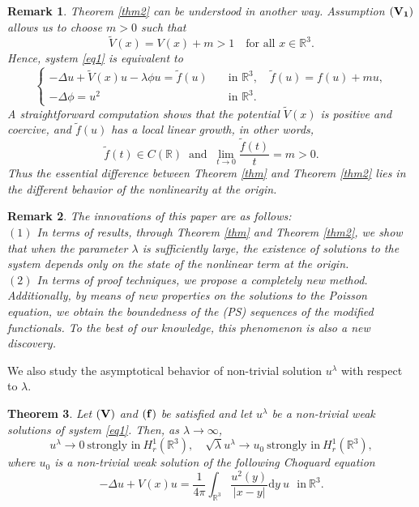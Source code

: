 \documentclass[12pt]{amsart}
\numberwithin{equation}{section}
\newtheorem{theorem}{Theorem}[section]
\newtheorem{remark}[theorem]{Remark}
\theoremstyle{definition}
\begin{document}
\begin{remark}{\rm
Theorem \ref{thm2} can be understood in another way.
Assumption ${\bf (V_1)}$ allows us to choose $m>0$ such that
\begin{equation}\label{tilde_V}\tilde V(x)=V(x)+m>1 
\quad\mbox{for all }x\in\mathbb{R}^3.
\end{equation}
Hence, system \eqref{eq1} is equivalent to  
\begin{equation*}
	\begin{cases}
			-\Delta u+\tilde V(x)u-\lambda \phi u=\tilde f(u) &\quad\text{in }\mathbb R^3,\quad\tilde f(u)=f(u)+mu,\\
		-\Delta\phi=u^2 &\quad\text{in }\mathbb R^3.
	\end{cases}
\end{equation*}
A straightforward computation shows that the potential $\tilde V(x)$ is positive and coercive, and $\tilde f(u)$ has a local linear growth, in other words,
$$\tilde f(t)\in C(\mathbb{R})\ \mbox{ and }\ \lim\limits_{t\rightarrow0}\frac{\tilde f(t)}{t}=m>0.$$
Thus the essential difference between Theorem \ref{thm} and Theorem \ref{thm2} lies in the different behavior of the nonlinearity at the origin.}
\end{remark}

\begin{remark}{\rm
The innovations of this paper are as follows:\\
$(1)$ In terms of results, through Theorem \ref{thm} and Theorem \ref{thm2}, we show that when the parameter $\lambda$ is sufficiently large, the existence of solutions to the system depends only on the state of the nonlinear term at the origin.\\
$(2)$ In terms of proof techniques, we propose a completely new method. Additionally, by means of new properties on the solutions to the Poisson equation, we obtain the boundedness of the (PS) sequences of the modified functionals. To the best of our knowledge, this phenomenon is also a new discovery.}
\end{remark}

We also study the asymptotical behavior of non-trivial solution $u^\lambda$ with respect to $\lambda$.

\begin{theorem}\label{thm3} Let ${\bf (V)}$ and ${\bf (f)}$
be satisfied and let $u^\lambda$ be a non-trivial weak solutions of system \eqref{eq1}. Then, as $\lambda\to\infty$,
\begin{equation*}
	u^{\lambda}\to 0~\text{strongly~in}~H^{1}_{r}(\mathbb{R}^3),\quad
	\sqrt{\lambda}u^{\lambda}\to u_0~\text{strongly~in}~H^{1}_{r}(\mathbb{R}^3),
\end{equation*}		
where $u_0$ is a non-trivial weak solution of the following Choquard equation
\begin{equation*}
			-\Delta u+V(x)u=\frac{1}{4\pi}\int_{\mathbb R^3}\frac{u^2(y)}{|x-y|}\text{d}y~u\ \ ~\text{in}~\mathbb{R}^3.
\end{equation*}
\end{theorem}
\end{document}
